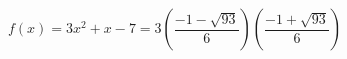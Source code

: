 \documentclass{ximera}
\author{Lee Wayand}
\begin{document}
\begin{example}








\begin{question}


\[
f(x) = 3x^2 + x - 7 = 3 \left( \frac{-1 - \sqrt{93}}{6} \right) \left( \frac{-1 + \sqrt{93}}{6} \right)
\]

\end{question}















\end{example}
\end{document}
